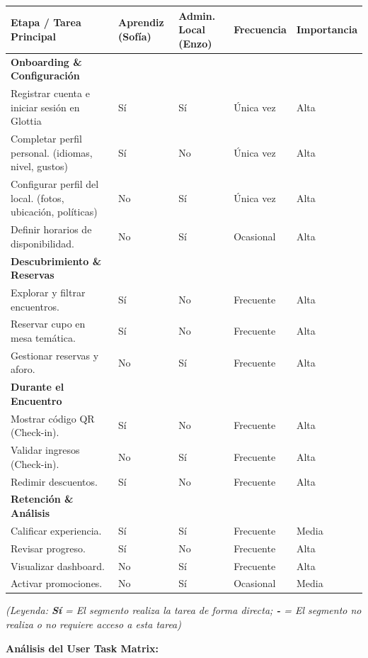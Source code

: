 \begin{longtable}{p{4cm} p{3cm} p{2cm} p{2cm} p{2cm}}
\toprule
Etapa / Tarea Principal & Aprendiz (Sofía) & Admin. Local (Enzo) & Frecuencia & Importancia \\
\midrule

\textbf{Onboarding \& Configuración} & & & & \\
Registrar cuenta e iniciar sesión en Glottia & Sí & Sí & Única vez & Alta \\
Completar perfil personal. (idiomas, nivel, gustos) & Sí & No & Única vez & Alta \\
Configurar perfil del local. (fotos, ubicación, políticas) & No & Sí & Única vez & Alta \\
Definir horarios de disponibilidad. & No & Sí & Ocasional & Alta \\

\textbf{Descubrimiento \& Reservas} & & & & \\
Explorar y filtrar encuentros. & Sí & No & Frecuente & Alta \\
Reservar cupo en mesa temática. & Sí & No & Frecuente & Alta \\
Gestionar reservas y aforo. & No & Sí & Frecuente & Alta \\

\textbf{Durante el Encuentro} & & & & \\
Mostrar código QR (Check-in). & Sí & No & Frecuente & Alta \\
Validar ingresos (Check-in). & No & Sí & Frecuente & Alta \\
Redimir descuentos. & Sí & No & Frecuente & Alta \\

\textbf{Retención \& Análisis} & & & & \\
Calificar experiencia. & Sí & Sí & Frecuente & Media \\
Revisar progreso. & Sí & No & Frecuente & Alta \\
Visualizar dashboard. & No & Sí & Frecuente & Alta \\
Activar promociones. & No & Sí & Ocasional & Media \\

\bottomrule
\end{longtable}

\emph{(Leyenda: \textbf{Sí} = El segmento realiza la tarea de forma
directa; \textbf{-} = El segmento no realiza o no requiere acceso a esta
tarea)}

\textbf{Análisis del User Task Matrix:}

